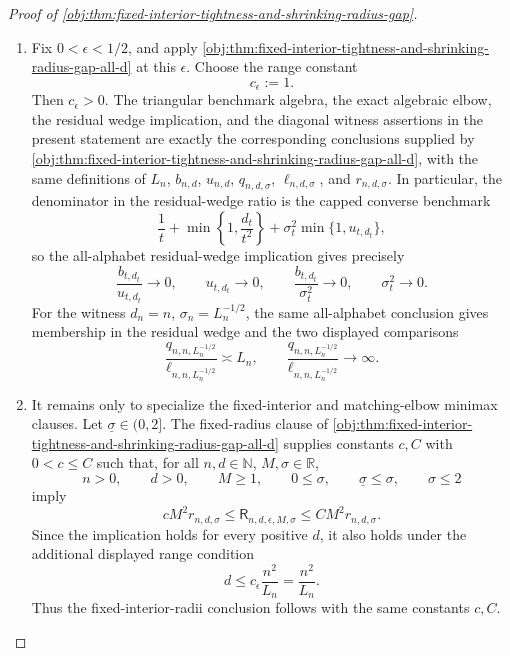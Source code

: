 \begin{proof}[Proof of \cref{obj:thm:fixed-interior-tightness-and-shrinking-radius-gap}]
\begin{enumerate}
\item Fix \(0<\epsilon<1/2\), and apply \cref{obj:thm:fixed-interior-tightness-and-shrinking-radius-gap-all-d} at this \(\epsilon\).  Choose the range constant
\[
c_\epsilon:=1 .
\]
Then \(c_\epsilon>0\).  The triangular benchmark algebra, the exact algebraic elbow, the residual wedge implication, and the diagonal witness assertions in the present statement are exactly the corresponding conclusions supplied by \cref{obj:thm:fixed-interior-tightness-and-shrinking-radius-gap-all-d}, with the same definitions of \(L_n\), \(b_{n,d}\), \(u_{n,d}\), \(q_{n,d,\sigma}\), \(\ell_{n,d,\sigma}\), and \(r_{n,d,\sigma}\).  In particular, the denominator in the residual-wedge ratio is the capped converse benchmark
\[
\frac1t+\min\left\{1,\frac{d_t}{t^2}\right\}
+\sigma_t^2\min\{1,u_{t,d_t}\},
\]
so the all-alphabet residual-wedge implication gives precisely
\[
\frac{b_{t,d_t}}{u_{t,d_t}}\to0,\qquad
u_{t,d_t}\to0,\qquad
\frac{b_{t,d_t}}{\sigma_t^2}\to0,\qquad
\sigma_t^2\to0 .
\]
For the witness \(d_n=n\), \(\sigma_n=L_n^{-1/2}\), the same all-alphabet conclusion gives membership in the residual wedge and the two displayed comparisons
\[
\frac{q_{n,n,L_n^{-1/2}}}{\ell_{n,n,L_n^{-1/2}}}\asymp L_n,
\qquad
\frac{q_{n,n,L_n^{-1/2}}}{\ell_{n,n,L_n^{-1/2}}}\to\infty .
\]

\item It remains only to specialize the fixed-interior and matching-elbow minimax clauses.  Let \(\underline\sigma\in(0,2]\).  The fixed-radius clause of \cref{obj:thm:fixed-interior-tightness-and-shrinking-radius-gap-all-d} supplies constants \(c,C\) with \(0<c\le C\) such that, for all \(n,d\in\mathbb N\), \(M,\sigma\in\mathbb R\),
\[
n>0,\qquad d>0,\qquad M\ge1,\qquad
0\le\sigma,\qquad \underline\sigma\le\sigma,\qquad \sigma\le2
\]
imply
\[
cM^2r_{n,d,\sigma}
\le
\mathsf R_{n,d,\epsilon,M,\sigma}
\le
CM^2r_{n,d,\sigma}.
\]
Since the implication holds for every positive \(d\), it also holds under the additional displayed range condition
\[
d\le c_\epsilon\frac{n^2}{L_n}
=\frac{n^2}{L_n}.
\]
Thus the fixed-interior-radii conclusion follows with the same constants \(c,C\).  %


\end{enumerate}
\end{proof}
